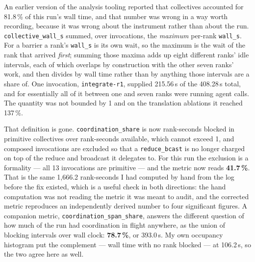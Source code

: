 \documentclass[11pt]{article}
\begin{document}
An earlier version of the analysis tooling reported that collectives accounted for 81.8\,\% of
this run's wall time, and that number was wrong in a way worth recording, because it was wrong
about the instrument rather than about the run. \texttt{collective\_wall\_s} summed, over
invocations, the \emph{maximum} per-rank \texttt{wall\_s}. For a barrier a rank's
\texttt{wall\_s} is its own wait, so the maximum is the wait of the rank that arrived
\emph{first}; summing those maxima adds up eight different ranks' idle intervals, each of
which overlaps by construction with the other seven ranks' work, and then divides by wall time
rather than by anything those intervals are a share of. One invocation,
\texttt{integrate-r1}, supplied 215.56\,s of the 408.28\,s total, and for essentially all of it
between one and seven ranks were running agent calls. The quantity was not bounded by 1 and on
the translation ablations it reached 137\,\%.

That definition is gone. \texttt{coordination\_share} is now rank-seconds blocked in primitive
collectives over rank-seconds available, which cannot exceed 1, and composed invocations are
excluded so that a \texttt{reduce\_bcast} is no longer charged on top of the reduce and
broadcast it delegates to. For this run the exclusion is a formality --- all 13 invocations are
primitive --- and the metric now reads \textbf{41.7\,\%}. That is the same 1{,}666.2
rank-seconds I had computed by hand from the log before the fix existed, which is a useful
check in both directions: the hand computation was not reading the metric it was meant to
audit, and the corrected metric reproduces an independently derived number to four significant
figures. A companion metric, \texttt{coordination\_span\_share}, answers the different question
of how much of the run had coordination in flight anywhere, as the union of blocking intervals
over wall clock: \textbf{78.7\,\%}, or 393.0\,s. My own occupancy histogram put the complement
--- wall time with no rank blocked --- at 106.2\,s, so the two agree here as well.
\end{document}
